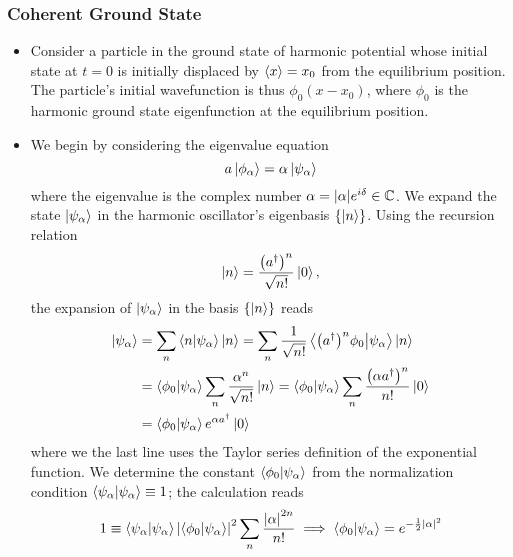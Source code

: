 \documentclass[11pt, a4paper]{article}
\newcommand{\p}{\psi}  %
\renewcommand{\k}[1]{\ket{#1}}
\begin{document}
\subsubsection{Coherent Ground State}
\begin{itemize}
	\item Consider a particle in the ground state of harmonic potential whose initial state at $ t = 0 $ is initially displaced by $ \ev{x} = x_{0} $ from the equilibrium position. The particle's initial wavefunction is thus $ \phi_{0}(x - x_{0}) $, where $ \phi_{0} $ is the harmonic ground state eigenfunction at the equilibrium position.
	
	\item We begin by considering the eigenvalue equation
	\begin{equation*}
		a \k{\phi_{\alpha}} = \alpha\k{\p_{\alpha}}
	\end{equation*}
	where the eigenvalue is the complex number $ \alpha = \abs{\alpha}e^{i\delta} \in \mathbb{C}$. We expand the state $ \k{\p_{\alpha}} $ in the harmonic oscillator's eigenbasis $ \{\ket{n}\} $. Using the recursion relation
	\begin{equation*}
		\ket{n} = \frac{\big(a^{\dagger}\big)^{n}}{\sqrt{n!}}\k{0},
	\end{equation*}
	the expansion of $ \k{\p_{\alpha}} $ in the basis $ \{\k{n} \} $ reads
	\begin{align*}
		\k{\p_{\alpha}} &= \sum_{n}\braket{n}{\p_{\alpha}}\ket{n} = \sum_{n} \frac{1}{\sqrt{n!}} \braket{\big(a^{\dagger}\big)^{n}\phi_{0}}{\p_{\alpha}}\ket{n} \\
		& = \braket{\phi_{0}}{\p_{\alpha}}\sum_{n}\frac{\alpha^{n}}{\sqrt{n!}}\ket{n} = \braket{\phi_{0}}{\p_{\alpha}}\sum_{n}\frac{\big(\alpha a^{\dagger}\big)^{n}}{n!}\ket{0}\\
		& = \braket{\phi_{0}}{\p_{\alpha}}e^{\alpha a^{\dagger}}\ket{0}
	\end{align*} 
	where we the last line uses the Taylor series definition of the exponential function. We determine the constant $ \braket{\phi_{0}}{\p_{\alpha}} $ from the normalization condition $ \braket{\p_{\alpha}}{\p_{\alpha}} \equiv 1 $; the calculation reads
	\begin{equation*}
		1 \equiv \braket{\p_{\alpha}}{\p_{\alpha}} \abs{\braket{\phi_{0}}{\p_{\alpha}}}^{2}\sum_{n}\frac{\abs{\alpha}^{2n}}{n!} \implies \braket{\phi_{0}}{\p_{\alpha}} = e^{-\frac{1}{2}\abs{\alpha}^{2}}
	\end{equation*}
	

\end{itemize}
\end{document}
